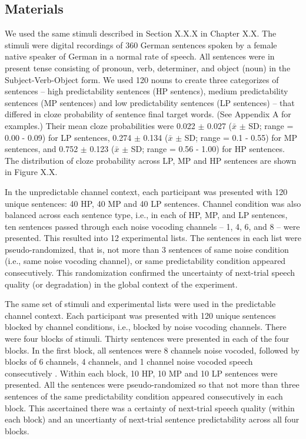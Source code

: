 \documentclass[a4paper, nobind]{templates/ociamthesis}
\begin{document}
\hypertarget{materials}{%
\subsection{Materials}\label{materials}}

We used the same stimuli described in Section X.X.X in Chapter X.X.
The stimuli were digital recordings of 360 German sentences spoken by a female native speaker of German in a normal rate of speech.
All sentences were in present tense consisting of pronoun, verb, determiner, and object (noun) in the Subject-Verb-Object form.
We used 120 nouns to create three categorizes of sentences -- high predictability sentences (HP sentencs), medium predictability sentences (MP sentences) and low predictability sentences (LP sentences) -- that differed in cloze probability of sentence final target words.
(See Appendix A for examples.)
Their mean cloze probabilities were 0.022 \(\pm\) 0.027 (\(\bar{x}\) \(\pm\) SD; range = 0.00 - 0.09) for LP sentences, 0.274 \(\pm\) 0.134 (\(\bar{x}\) \(\pm\) SD; range = 0.1 - 0.55) for MP sentences, and 0.752 \(\pm\) 0.123 (\(\bar{x}\) \(\pm\) SD; range = 0.56 - 1.00) for HP sentences.
The distribution of cloze probability across LP, MP and HP sentences are shown in Figure X.X.

In the unpredictable channel context, each participant was presented with 120 unique sentences: 40 HP, 40 MP and 40 LP sentences. Channel condition was also balanced across each sentence type, i.e., in each of HP, MP, and LP sentences, ten sentences passed through each noise vocoding channels -- 1, 4, 6, and 8 -- were presented.
This resulted into 12 experimental lists.
The sentences in each list were pseudo-randomized, that is, not more than 3 sentences of same noise condition (i.e., same noise vocoding channel), or same predictability condition appeared consecutively.
This randomization confirmed the uncertainty of next-trial speech quality (or degradation) in the global context of the experiment.

The same set of stimuli and experimental lists were used in the predictable channel context.
Each participant was presented with 120 unique sentences blocked by channel conditions, i.e., blocked by noise vocoding channels.
There were four blocks of stimuli.
Thirty sentences were presented in each of the four blocks.
In the first block, all sentences were 8 channels noise vocoded, followed by blocks of 6 channels, 4 channels, and 1 channel noise vocoded speech consecutively \autocite{Sheldon2008a}.
Within each block, 10 HP, 10 MP and 10 LP sentences were presented.
All the sentences were pseudo-randomized so that not more than three sentences of the same predictability condition appeared consecutively in each block.
This ascertained there was a certainty of next-trial speech quality (within each block) and an uncertianty of next-trial sentence predictability across all four blocks.
\end{document}
